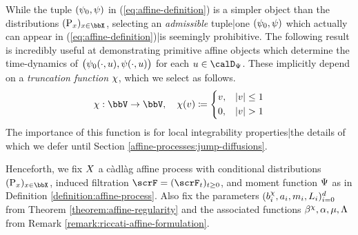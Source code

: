 While the tuple $(\psi_0, \psi)$ in (\ref{eq:affine-definition}) is a simpler object than the distributions $(\Prb_\stateVar)_{\stateVar\in\stateSpace}$, selecting an \emph{admissible} tuple|one $(\psi_0, \psi)$ which actually can appear in (\ref{eq:affine-definition})|is seemingly prohibitive.
The following result is incredibly useful at demonstrating primitive affine objects which determine the time-dynamics of $\big(\psi_0(\cdot,u), \psi(\cdot,u)\big)$ for each $\momentVar \in \momentSpace$.
These implicitly depend on a \emph{truncation function} $\chi$, which we select as follows.
\begin{equation}
  \label{eq:truncation}
  \trunc: \vecSpace \rightarrow \vecSpace, \quad \trunc(\vecVar) \defeq \left\{\begin{aligned}
    &\vecVar, & |\vecVar| \leq 1 \\
    &0, & |\vecVar| > 1 
  \end{aligned}\right.
\end{equation}
The importance of this function is for local integrability properties|the details of which we defer until Section \ref{affine-processes:jump-diffusions}.






Henceforth, we fix $X$ a c\`adl\`ag affine process with conditional distributions $(\Prb_\stateVar)_{\stateVar\in\stateSpace}$, induced filtration $\scrF=(\scrF_t)_{t\geq0}$, and moment function $\Psi$ as in Definition \ref{definition:affine-process}.
Also fix the parameters $(b^\chi_i, a_i, m_i, L_i)_{i=0}^d$ from Theorem \ref{theorem:affine-regularity} and the associated functions $\beta^\chi, \alpha, \mu, \Lambda$ from Remark \ref{remark:riccati-affine-formulation}.
